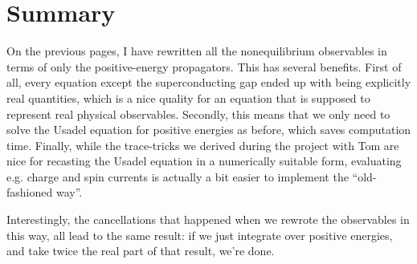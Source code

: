 \section{Summary}
On the previous pages, I have rewritten all the nonequilibrium observables in terms of only the positive-energy propagators.
This has several benefits.
First of all, every equation except the superconducting gap ended up with being explicitly real quantities, which is a nice quality for an equation that is supposed to represent real physical observables.
Secondly, this means that we only need to solve the Usadel equation for positive energies as before, which saves computation time.
Finally, while the trace-tricks we derived during the project with Tom are nice for recasting the Usadel equation in a numerically suitable form, evaluating e.g. charge and spin currents is actually a bit easier to implement the ``old-fashioned way''.

Interestingly, the cancellations that happened when we rewrote the observables in this way, all lead to the same result: if we just integrate over positive energies, and take twice the real part of that result, we're done.
